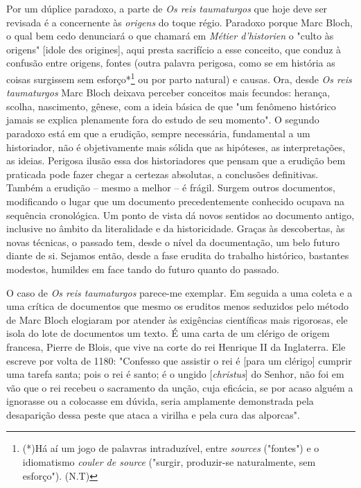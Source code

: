 \documentclass[a5paper]{book}
\begin{document}
Por um dúplice paradoxo, a parte de \textit{Os reis taumaturgos} que hoje deve ser revisada é a concernente às \textit{origens} do toque régio. Paradoxo porque Marc Bloch, o qual bem cedo denunciará o que chamará em \textit{Métier d'historien} o "culto às origens" [idole des origines], aqui presta sacrifício a esse conceito, que conduz à confusão entre origens, fontes (outra palavra perigosa, como se em história as coisas surgissem sem esforço*{\let\thefootnote\relax\footnote{(*)Há aí um jogo de palavras intraduzível, entre \textit{sources} ("fontes") e o idiomatismo \textit{couler de source} ("surgir, produzir-se naturalmente, sem esforço"). (N.T)}} ou por parto natural) e causas. Ora, desde \textit{Os reis taumaturgos} Marc Bloch deixava perceber conceitos mais fecundos: herança, scolha, nascimento, gênese, com a ideia básica de que "um fenômeno histórico jamais se explica plenamente fora do estudo de seu momento". O segundo paradoxo está em que a erudição, sempre necessária, fundamental a um historiador, não é objetivamente mais sólida que as hipóteses, as interpretações, as ideias. Perigosa ilusão essa dos historiadores que pensam que a erudição bem praticada pode fazer chegar a certezas absolutas, a conclusões definitivas. Também a erudição -- mesmo a melhor -- é frágil. Surgem outros documentos, modificando o lugar que um documento precedentemente conhecido ocupava na sequência cronológica. Um ponto de vista dá novos sentidos ao documento antigo, inclusive no âmbito da literalidade e da historicidade. Graças às descobertas, às novas técnicas, o passado tem, desde o nível da documentação, um belo futuro diante de si. Sejamos então, desde a fase erudita do trabalho histórico, bastantes modestos, humildes em face tando do futuro quanto do passado.

O caso de \textit{Os reis taumaturgos} parece-me exemplar. Em seguida a uma coleta e a uma crítica de documentos que mesmo os eruditos menos seduzidos pelo método de Marc Bloch elogiaram por atender às exigências científicas mais rigorosas, ele isola do lote de documentos um texto. É uma carta de um clérigo de origem francesa, Pierre de Blois, que vive na corte do rei Henrique II da Inglaterra. Ele escreve por volta de 1180: "Confesso que assistir o rei é [para um clérigo] cumprir uma tarefa santa; pois o rei é santo; é o ungido [\textit{christus}] do Senhor, não foi em vão que o rei recebeu o sacramento da unção, cuja eficácia, se por acaso alguém a ignorasse ou a colocasse em dúvida, seria amplamente demonstrada pela desaparição dessa peste que ataca a virilha e pela cura das alporcas".\footnotemark[24]
\end{document}
